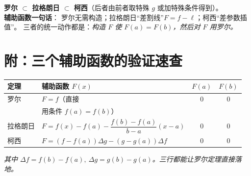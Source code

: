 \documentclass[11pt]{article}
\begin{document}
\begin{tcolorbox}[colback=boxbg,colframe=auxc!70,title={\bfseries 记忆要点}]
\;
\textbf{罗尔 $\subset$ 拉格朗日 $\subset$ 柯西}（后者由前者取特殊 $g$ 或加特殊条件得到）。\\
\textbf{辅助函数一句话}：
罗尔无需构造；拉格朗日“差割线”$F=f-\ell$；柯西“差参数插值”。
三者的统一动作都是：\emph{构造 $F$ 使 $F(a)=F(b)$，然后对 $F$ 用罗尔。}
\end{tcolorbox}

\section*{附：三个辅助函数的验证速查}
\begin{center}
\renewcommand{\arraystretch}{1.4}
\begin{tabular}{>{\centering\arraybackslash}p{2.4cm} >{\centering\arraybackslash}p{6.8cm} c c}
\toprule
\textbf{定理} & \textbf{辅助函数 $F(x)$} & $F(a)$ & $F(b)$\\
\midrule
罗尔 & $F=f$（直接 & $0$ & $0$\\
     & 用条件 $f(a)=f(b)$） & & \\
拉格朗日 & $F=f(x)-f(a)-\dfrac{f(b)-f(a)}{b-a}(x-a)$ & $0$ & $0$\\
柯西 & $F=(f-f(a))\Delta g-(g-g(a))\Delta f$ & $0$ & $0$\\
\bottomrule
\end{tabular}
\end{center}
\emph{其中 $\Delta f=f(b)-f(a),\ \Delta g=g(b)-g(a)$。三行都能让罗尔定理直接落地。}
\end{document}
